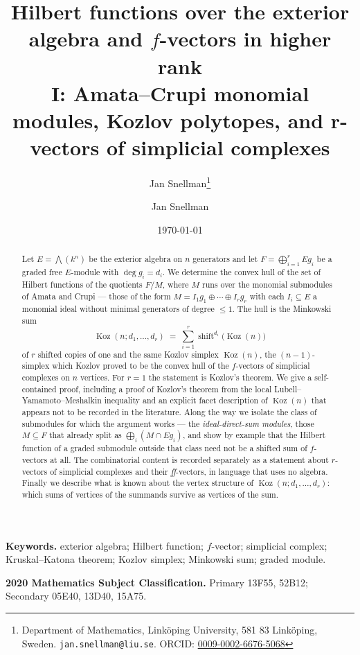 \documentclass[11pt, a4paper, abstract=yes]{scrartcl}
\author{Jan Snellman\thanks{Department of Mathematics, Linköping University, 581 83 Linköping, Sweden. \texttt{jan.snellman@liu.se}. ORCID: \href{https://orcid.org/0009-0002-6676-5068}{0009-0002-6676-5068}}}
\author{Jan Snellman \orcidlink{0009-0002-6676-5068}}
\date{\today}
\title{Hilbert functions over the exterior algebra and \(f\)-vectors in higher rank\\\medskip
\large I: Amata--Crupi monomial modules, Kozlov polytopes, and r-vectors of simplicial complexes}
\theoremstyle{definition}
\theoremstyle{remark}
\theoremstyle{plain}
\newcommand{\Koz}{\operatorname{Koz}}
\newcommand{\shift}{\operatorname{shift}}
\let\autocite\cite
\begin{document}
\maketitle
\begin{abstract}
Let \(E=\bigwedge(k^n)\) be the exterior algebra on \(n\) generators and let
\(F=\bigoplus_{i=1}^{r}Eg_i\) be a graded free \(E\)-module with \(\deg g_i=d_i\). We determine the
convex hull of the set of Hilbert functions of the quotients \(F/M\), where \(M\) runs over the
monomial submodules of Amata and Crupi --- those of the form \(M=I_1g_1\oplus\cdots\oplus I_rg_r\)
with each \(I_i\subseteq E\) a monomial ideal without minimal generators of degree \(\le1\). The
hull is the Minkowski sum
\begin{equation}\label{eq:eq}
  \Koz(n;d_1,\dots,d_r)\;=\;\sum_{i=1}^{r}\shift^{d_i}\bigl(\Koz(n)\bigr)
\end{equation}
of \(r\) shifted copies of one and the same Kozlov simplex \(\Koz(n)\), the \((n-1)\)-simplex which
Kozlov proved \autocite{Kozlov1997} to be the convex hull of the \(f\)-vectors of simplicial complexes on \(n\)
vertices. For \(r=1\) the statement is Kozlov's theorem. We give a self-contained proof, including a
proof of Kozlov's theorem from the local Lubell--Yamamoto--Meshalkin inequality and an explicit
facet description of \(\Koz(n)\) that appears not to be recorded in the literature. Along the way we
isolate the class of submodules for which the argument works --- the \emph{ideal-direct-sum modules},
those \(M\subseteq F\) that already split as \(\bigoplus_i(M\cap Eg_i)\), and show by example that
the Hilbert function of a graded submodule outside that class need not be a shifted sum of
\(f\)-vectors at all. The combinatorial content is recorded separately as a statement about
\(r\)-vectors of simplicial complexes and their \emph{ff}-vectors, in language that uses no algebra.
Finally we describe what is known about the vertex structure of \(\Koz(n;d_1,\dots,d_r)\): which
sums of vertices of the summands survive as vertices of the sum.
\end{abstract}

\medskip\noindent\textbf{Keywords.} exterior algebra; Hilbert function; \(f\)-vector; simplicial
complex; Kruskal--Katona theorem; Kozlov simplex; Minkowski sum; graded module.

\smallskip\noindent\textbf{2020 Mathematics Subject Classification.} Primary 13F55, 52B12;
Secondary 05E40, 13D40, 15A75.
\medskip

\setcounter{tocdepth}{2}
\tableofcontents
\end{document}
